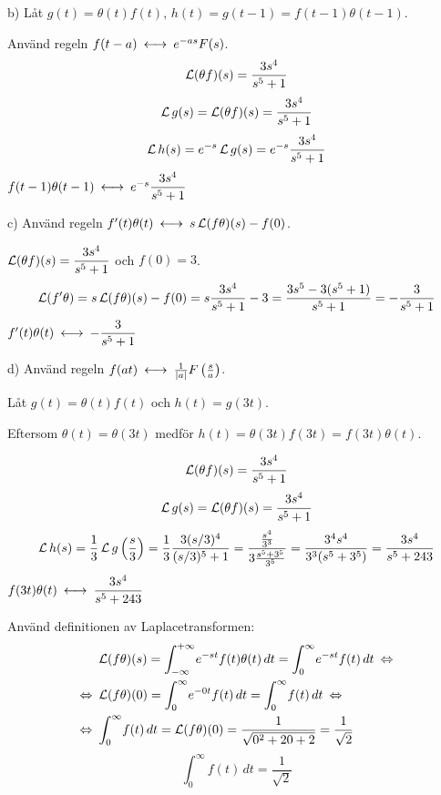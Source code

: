 \begin{task}{b)}
	Låt $g(t)=\theta(t)f(t)$, $h(t)=g(t-1)=f(t-1)\theta(t-1)$.
	
	Använd regeln $f(t-a) \llra e^{-as}F(s)$.
	\[\operatorname{\mathcal{L}}(\theta f)(s)=\frac{3s^4}{s^5+1}\]
	\begin{align*}
	\operatorname{\mathcal{L}} g(s)=
	\operatorname{\mathcal{L}}(\theta f)(s)=
	\frac{3s^4}{s^5+1}
	\end{align*}
	\begin{align*}
	\laplace h(s)=
	e^{-s}\laplace g(s)=
	e^{-s}\*\frac{3s^4}{s^5+1}
	\end{align*}
	\ans $f(t-1)\theta(t-1)\llra e^{-s}\*\dfrac{3s^4}{s^5+1}$
\end{task}

\begin{task}{c)}
	Använd regeln $f'(t)\theta(t)\llra s\laplace(f\theta)(s)-f(0)$.
	
	$\operatorname{\mathcal{L}}(\theta f)(s)=\dfrac{3s^4}{s^5+1}$ och $f(0)=3$.
	\begin{align*}
	\operatorname{\mathcal{L}}(f'\theta)=
	s\operatorname{\mathcal{L}}(f\theta)(s)-f(0)=
	s\frac{3s^4}{s^5+1}-3=
	\frac{3s^5-3(s^5+1)}{s^5+1}=
	-\frac{3}{s^5+1}
	\end{align*}
	\ans $f'(t)\theta(t)\llra-\dfrac{3}{s^5+1}$
\end{task}

\begin{task}{d)}
	Använd regeln $f(at) \llra \frac{1}{\abs{a}}F\left(\frac{s}{a}\right)$.
	
	Låt $g(t)=\theta(t)f(t)$ och $h(t)=g(3t)$. 
	
	Eftersom $\theta(t)=\theta(3t)$ medför $h(t)=\theta(3t)f(3t)=f(3t)\theta(t)$.
	
	\[\operatorname{\mathcal{L}}(\theta f)(s)=\frac{3s^4}{s^5+1}\]
	\begin{align*}
	\operatorname{\mathcal{L}} g(s)=
	\operatorname{\mathcal{L}} (\theta f)(s)=
	\frac{3s^4}{s^5+1}
	\end{align*}
	\begin{align*}
	\laplace h(s)=
	\frac{1}{3}\laplace g\left(\frac{s}{3}\right)=
	\frac{1}{3}\*\frac{3(s/3)^4}{(s/3)^5+1}=
	\frac{\frac{s^4}{3^3}}{3\*\frac{s^5+3^5}{3^5}}=
	\frac{3^4s^4}{3^3(s^5+3^5)}=
	\frac{3s^4}{s^5+243}
	\end{align*}
	\ans $f(3t)\theta(t)\llra\dfrac{3s^4}{s^5+243}$
\end{task}

\begin{task}{3.11}
	Använd definitionen av Laplacetransformen:
	\begin{align*}
	&\laplace (f\theta)(s)= \int_{-\infty}^{+\infty}\! e^{-st}f(t)\theta(t)\, dt =
	\int_{0}^{\infty}\! e^{-st}f(t)\, dt \lra \\ \lra
	&\laplace (f\theta)(0)= \int_{0}^{\infty}\! e^{-0\*t}f(t)\, dt =
	\int_{0}^{\infty}\! f(t)\, dt \lra \\ \lra
	&\int_{0}^{\infty}\! f(t)\, dt=
	\laplace (f\theta)(0) =
	\frac{1}{\sqrt{0^2+2\*0+2}} =
	\frac{1}{\sqrt{2}}
	\end{align*}
	\ans \[\int_{0}^{\infty}\! f(t)\, dt = \frac{1}{\sqrt{2}}\]
\end{task}

